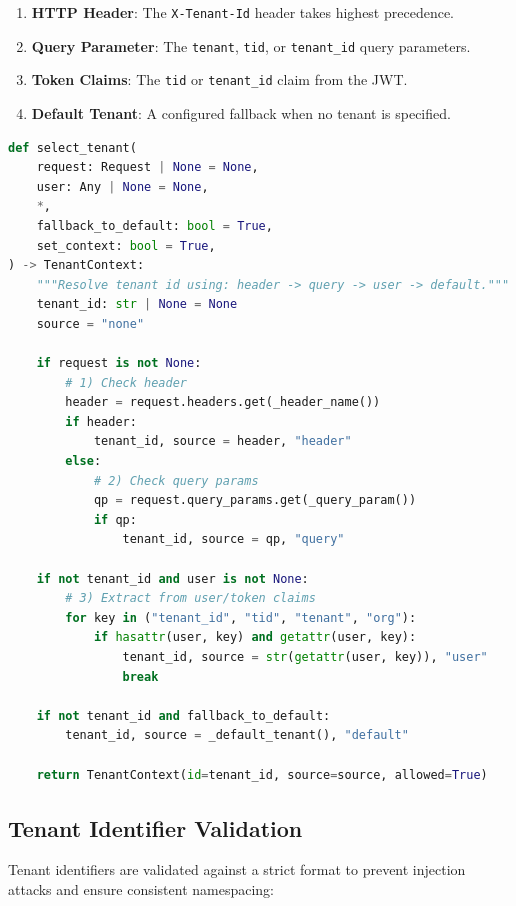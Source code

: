 \begin{enumerate}
    \item \textbf{HTTP Header}: The \texttt{X-Tenant-Id} header takes highest precedence.
    \item \textbf{Query Parameter}: The \texttt{tenant}, \texttt{tid}, or \texttt{tenant\_id} query parameters.
    \item \textbf{Token Claims}: The \texttt{tid} or \texttt{tenant\_id} claim from the JWT.
    \item \textbf{Default Tenant}: A configured fallback when no tenant is specified.
\end{enumerate}

\begin{lstlisting}[language=Python,caption={Tenant selection with priority-based extraction}]
def select_tenant(
    request: Request | None = None,
    user: Any | None = None,
    *,
    fallback_to_default: bool = True,
    set_context: bool = True,
) -> TenantContext:
    """Resolve tenant id using: header -> query -> user -> default."""
    tenant_id: str | None = None
    source = "none"
    
    if request is not None:
        # 1) Check header
        header = request.headers.get(_header_name())
        if header:
            tenant_id, source = header, "header"
        else:
            # 2) Check query params
            qp = request.query_params.get(_query_param())
            if qp:
                tenant_id, source = qp, "query"
    
    if not tenant_id and user is not None:
        # 3) Extract from user/token claims
        for key in ("tenant_id", "tid", "tenant", "org"):
            if hasattr(user, key) and getattr(user, key):
                tenant_id, source = str(getattr(user, key)), "user"
                break
    
    if not tenant_id and fallback_to_default:
        tenant_id, source = _default_tenant(), "default"
    
    return TenantContext(id=tenant_id, source=source, allowed=True)
\end{lstlisting}

\subsection{Tenant Identifier Validation}
\label{subsec:tenant-validation}

Tenant identifiers are validated against a strict format to prevent injection attacks and ensure consistent namespacing:

